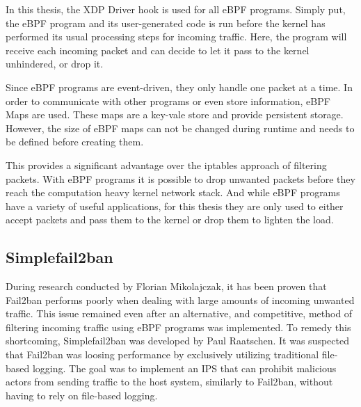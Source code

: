 In this thesis, the XDP Driver hook is used for all eBPF programs.
Simply put, the eBPF program and its user-generated code is run before the kernel has performed its usual processing steps for incoming traffic.
Here, the program will receive each incoming packet and can decide to let it pass to the kernel unhindered, or drop it.

Since eBPF programs are event-driven, they only handle one packet at a time.
In order to communicate with other programs or even store information, eBPF Maps are used.
These maps are a key-vale store and provide persistent storage.
However, the size of eBPF maps can not be changed during runtime and needs to be defined before creating them.\cite{mikolajczak:ebpf}

This provides a significant advantage over the iptables approach of filtering packets.
With eBPF programs it is possible to drop unwanted packets before they reach the computation heavy kernel network stack.
And while eBPF programs have a variety of useful applications, for this thesis they are only used to either accept packets and pass them to the kernel or drop them to lighten the load.

\subsection{Simplefail2ban}
During research conducted by Florian Mikolajczak, it has been proven that Fail2ban performs poorly when dealing with large amounts of incoming unwanted traffic.
This issue remained even after an alternative, and competitive, method of filtering incoming traffic using eBPF programs was implemented.
To remedy this shortcoming, Simplefail2ban was developed by Paul Raatschen.
It was suspected that Fail2ban was loosing performance by exclusively utilizing traditional file-based logging.
The goal was to implement an IPS that can prohibit malicious actors from sending traffic to the host system, similarly to Fail2ban, without having to rely on file-based logging.

